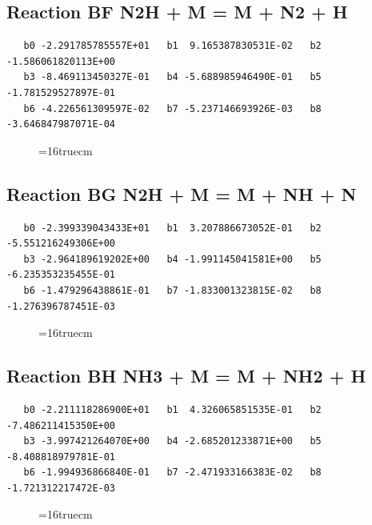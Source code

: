 \documentclass[12pt,dvipdfm]{article}
\begin{document}
\subsection{
Reaction BF N2H + M = M + N2 + H }
\begin{small}\begin{verbatim}
   b0 -2.291785785557E+01   b1  9.165387830531E-02   b2 -1.586061820113E+00
   b3 -8.469113450327E-01   b4 -5.688985946490E-01   b5 -1.781529527897E-01
   b6 -4.226561309597E-02   b7 -5.237146693926E-03   b8 -3.646847987071E-04
\end{verbatim}\end{small}
\begin{figure}[h!] \label{n2rates}
\epsfxsize=16truecm
\end{figure}
\newpage

\subsection{
Reaction BG N2H + M = M + NH + N }
\begin{small}\begin{verbatim}
   b0 -2.399339043433E+01   b1  3.207886673052E-01   b2 -5.551216249306E+00
   b3 -2.964189619202E+00   b4 -1.991145041581E+00   b5 -6.235353235455E-01
   b6 -1.479296438861E-01   b7 -1.833001323815E-02   b8 -1.276396787451E-03
\end{verbatim}\end{small}
\begin{figure}[h!] \label{n2rates}
\epsfxsize=16truecm
\end{figure}
\newpage

\subsection{
Reaction BH NH3 + M = M + NH2 + H }
\begin{small}\begin{verbatim}
   b0 -2.211118286900E+01   b1  4.326065851535E-01   b2 -7.486211415350E+00
   b3 -3.997421264070E+00   b4 -2.685201233871E+00   b5 -8.408818979781E-01
   b6 -1.994936866840E-01   b7 -2.471933166383E-02   b8 -1.721312217472E-03
\end{verbatim}\end{small}
\begin{figure}[h!] \label{n2rates}
\epsfxsize=16truecm
\end{figure}
\newpage
\end{document}
